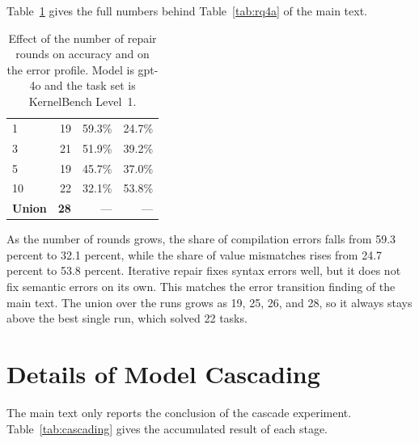 Table~\ref{tab:ablation} gives the full numbers behind Table~\ref{tab:rq4a} of the main text.

\begin{table}[h]
\centering
\small
\setlength{\tabcolsep}{5pt}
\caption{Effect of the number of repair rounds on accuracy and on the error profile.
Model is gpt-4o and the task set is KernelBench Level~1.}
\label{tab:ablation}
\begin{tabular}{@{}lrrr@{}}
\toprule
\headrow{Rounds} & \headrow{Solved (/100)} & \headrow{Compile err.} & \headrow{Value mism.} \\
\midrule
1  & 19 & 59.3\% & 24.7\% \\
3  & 21 & 51.9\% & 39.2\% \\
5  & 19 & 45.7\% & 37.0\% \\
10 & 22 & 32.1\% & 53.8\% \\
\midrule
\textbf{Union} & \textbf{28} & --- & --- \\
\bottomrule
\end{tabular}
\end{table}

As the number of rounds grows, the share of compilation errors falls from 59.3 percent to 32.1
percent, while the share of value mismatches rises from 24.7 percent to 53.8 percent. Iterative
repair fixes syntax errors well, but it does not fix semantic errors on its own. This matches the
error transition finding of the main text. The union over the runs grows as 19, 25, 26, and 28, so
it always stays above the best single run, which solved 22 tasks.

\section{Details of Model Cascading}

The main text only reports the conclusion of the cascade experiment. Table~\ref{tab:cascading}
gives the accumulated result of each stage.

